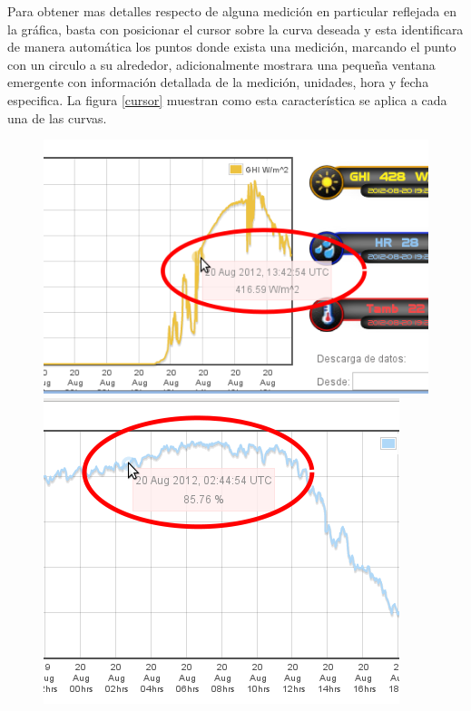Para obtener mas detalles respecto de alguna medición en particular reflejada en la gráfica, basta con posicionar el cursor sobre la curva deseada y esta identificara de manera automática los puntos donde exista una medición, marcando el punto con un circulo a su alrededor, adicionalmente mostrara una pequeña ventana emergente con información detallada de la medición, unidades, hora y fecha especifica. La figura \ref{cursor} muestran como esta característica se aplica a cada una de las curvas.

\begin{figure}[ht]
	\begin{minipage}[b]{0.32\linewidth}
        	\centering
        	\includegraphics[scale=0.35]{./images/cap5chap1img4-1}
	\end{minipage}
	\begin{minipage}[b]{0.32\linewidth}
                \centering
                \includegraphics[scale=0.35]{./images/cap5chap1img4-2}

\end{minipage}
\end{figure}
